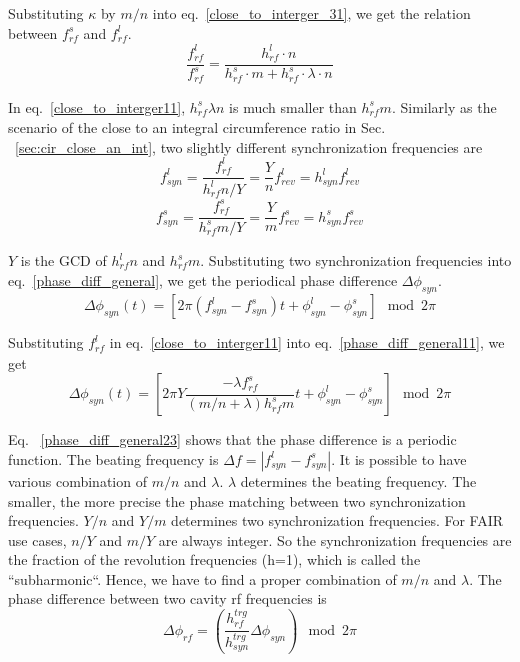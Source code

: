 Substituting $\kappa$ by $m/n$ into eq.~\ref{close_to_interger_31}, we get the relation between $f_{\mathit{rf}}^{s}$ and $f_{\mathit{rf}}^{l}$.
\begin{equation} 
\frac{f_{\mathit{rf}}^{l}}{f_{\mathit{rf}}^{s}}=\frac{h^l_\mathit{rf}\cdot n}{h^s_\mathit{rf} \cdot m+ h^s_\mathit{rf} \cdot\lambda\cdot n}\label{close_to_interger11}
\end{equation}

In eq.~\ref{close_to_interger11}, $h^s_\mathit{rf}\lambda n $ is much smaller than $h^s_\mathit{rf} m$. Similarly as the scenario of the close to an integral circumference ratio in Sec. ~\ref{sec:cir_close_an_int}, two slightly different synchronization frequencies are 
\begin{equation}
f_{\mathit{syn}}^{l}=\frac{f_{\mathit{rf}}^{l}}{h^l_\mathit{rf}n/Y}=\frac{Y}{n}f_{\mathit{rev}}^{l}=h_\mathit{syn}^\mathit{l}f_{\mathit{rev}}^{l} \label{synch_freq111}
\end{equation}
\begin{equation}
f_{\mathit{syn}}^{s}=\frac{f_{\mathit{rf}}^{s}}{h^s_\mathit{rf}m/Y}=\frac{Y}{m}f_{\mathit{rev}}^{s}=h_\mathit{syn}^\mathit{s}f_{\mathit{rev}}^{s} \label{synch_freq222}
\end{equation}

$Y$ is the GCD of $h^l_\mathit{rf} n$ and $h^s_\mathit{rf} m$. Substituting two synchronization frequencies into eq.~\ref{phase_diff_general}, we get the periodical phase difference $\Delta \phi_\mathit{syn}$.
\begin{equation}
	\Delta \phi_\mathit{syn}(t)=[2\pi(f_{\mathit{syn}}^{l}-f_{\mathit{syn}}^{s})t+\phi_\mathit{syn}^l-\phi^s_\mathit{syn}] \mod 2\pi \label{phase_diff_general11}
\end{equation}

Substituting $f_{\mathit{rf}}^{l}$ in eq.~\ref{close_to_interger11} into eq.~\ref{phase_diff_general11}, we get 
\begin{equation}
	\Delta \phi_\mathit{syn}(t)=[2\pi Y\frac{-\lambda f_{\mathit{rf}}^{s}}{(m/n+\lambda)h^s_\mathit{rf}m}t+\phi_\mathit{syn}^l-\phi^s_\mathit{syn}] \mod 2\pi \label{phase_diff_general23}
\end{equation}

Eq. ~\ref{phase_diff_general23} shows that the phase difference is a periodic function. The beating frequency is $\Delta f=|f_{\mathit{syn}}^{l}-f_{\mathit{syn}}^{s}|$. It is possible to have various combination of $m/n$ and $\lambda$. $\lambda$ determines the beating frequency. The smaller, the more precise the phase matching between two synchronization frequencies. $Y/n$ and $Y/m$ determines two synchronization frequencies. For FAIR use cases, $n/Y$ and $m/Y$ are always integer. So the synchronization frequencies are the fraction of the revolution frequencies (h=1), which is called the ``subharmonic``. Hence, we have to find a proper combination of $m/n$ and $\lambda$.  The phase difference between two cavity rf frequencies is
\begin{equation}
\Delta \phi_\mathit{rf}=(\frac{h_{\mathit{rf}}^{trg}}{h_{\mathit{syn}}^{trg}}\Delta \phi_\mathit{syn}) \mod 2\pi 
\end{equation}

